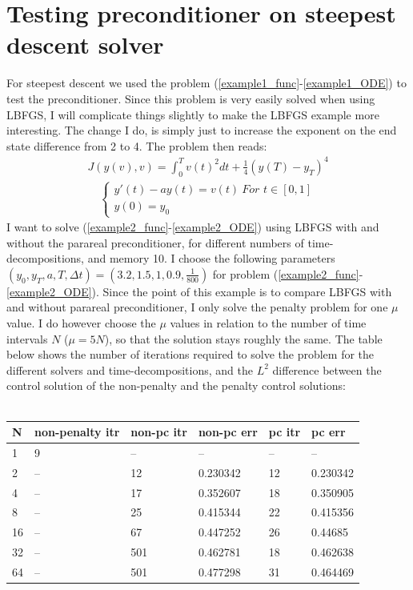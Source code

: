 \documentclass[11pt,a4paper]{article}
\begin{document}
\section{Testing preconditioner on steepest descent solver}
For steepest descent we used the problem (\ref{example1_func}-\ref{example1_ODE}) to test the preconditioner. Since this problem is very easily solved when using LBFGS, I will complicate things slightly to make the LBFGS example more interesting. The change I do, is simply just to increase the exponent on the end state difference from 2 to 4. The problem then reads:
\begin{align}
J(y(v),v)=\int_0^T v(t)^2 dt + \frac{1}{4}(y(T)-y_T)^4 \label{example2_func}
\end{align} 
\begin{align}
\left\{
     \begin{array}{lr}
		y'(t) - ay(t) = v(t) \ 	\textit{For $t \in [0,1]$} \\
		y(0)=y_0
	\end{array}
   \right. \label{example2_ODE}
\end{align}
I want to solve (\ref{example2_func}-\ref{example2_ODE}) using LBFGS with and without the parareal preconditioner, for different numbers of time-decompositions, and memory 10. I choose the following parameters $(y_0,y_T,a,T,\Delta t)=(3.2,1.5,1,0.9,\frac{1}{800})$ for problem (\ref{example2_func}-\ref{example2_ODE}). Since the point of this example is to compare LBFGS with and without parareal preconditioner, I only solve the penalty problem for one $\mu$ value. I do however choose the $\mu$ values in relation to the number of time intervals $N$ ($\mu=5N$), so that the solution stays roughly the same. The table below shows the number of iterations required to solve the problem for the different solvers and time-decompositions, and the $L^2$ difference between the control solution of the non-penalty and the penalty control solutions:
\\
\\
\begin{tabular}{llllll}
\toprule
{} N & non-penalty itr & non-pc itr & non-pc err & pc itr &    pc err \\
\midrule
1  &               9 &         -- &         -- &     -- &        -- \\
2  &              -- &         12 &   0.230342 &     12 &  0.230342 \\
4  &              -- &         17 &   0.352607 &     18 &  0.350905 \\
8  &              -- &         25 &   0.415344 &     22 &  0.415356 \\
16 &              -- &         67 &   0.447252 &     26 &   0.44685 \\
32 &              -- &        501 &   0.462781 &     18 &  0.462638 \\
64 &              -- &        501 &   0.477298 &     31 &  0.464469 \\
\bottomrule
\end{tabular}
\end{document}
